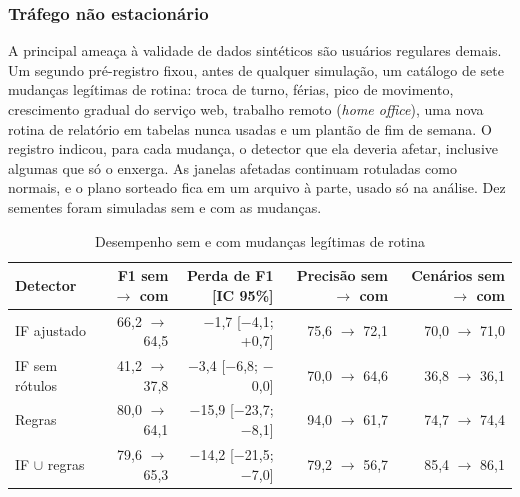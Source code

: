 \subsubsection{Tráfego não estacionário}

A principal ameaça à validade de dados sintéticos são usuários regulares demais. Um segundo
pré-registro fixou, antes de qualquer simulação, um catálogo de sete mudanças legítimas de
rotina: troca de turno, férias, pico de movimento, crescimento gradual do serviço web, trabalho
remoto (\textit{home office}), uma nova rotina de relatório em tabelas nunca usadas e um plantão
de fim de semana. O registro indicou, para cada mudança, o detector que ela deveria afetar,
inclusive algumas que só o \iforest{} enxerga. As janelas afetadas continuam rotuladas como
normais, e o plano sorteado fica em um arquivo à parte, usado só na análise. Dez sementes foram
simuladas sem e com as mudanças.

\begin{table}[htb]
    \centering
    \ABNTEXfontereduzida
    \setlength{\tabcolsep}{4pt}
    \begin{minipage}{\textwidth}
        \caption{\label{tab:deriva}Desempenho sem e com mudanças legítimas de rotina}
        \begin{tabular*}{\textwidth}{@{\extracolsep{\fill}}lrrrr}
            \toprule
            \textbf{Detector} & \textbf{F1 sem $\rightarrow$ com} & \textbf{Perda de F1 [IC 95\%]} &
            \textbf{Precisão sem $\rightarrow$ com} & \textbf{Cenários sem $\rightarrow$ com} \\
            \midrule
            IF ajustado      & 66,2 $\rightarrow$ 64,5 & $-$1,7 [$-$4,1; +0,7]   & 75,6 $\rightarrow$ 72,1 & 70,0 $\rightarrow$ 71,0 \\
            IF sem rótulos   & 41,2 $\rightarrow$ 37,8 & $-$3,4 [$-$6,8; $-$0,0] & 70,0 $\rightarrow$ 64,6 & 36,8 $\rightarrow$ 36,1 \\
            Regras           & 80,0 $\rightarrow$ 64,1 & $-$15,9 [$-$23,7; $-$8,1] & 94,0 $\rightarrow$ 61,7 & 74,7 $\rightarrow$ 74,4 \\
            IF $\cup$ regras & 79,6 $\rightarrow$ 65,3 & $-$14,2 [$-$21,5; $-$7,0] & 79,2 $\rightarrow$ 56,7 & 85,4 $\rightarrow$ 86,1 \\
            \bottomrule
        \end{tabular*}
    \end{minipage}
\end{table}

